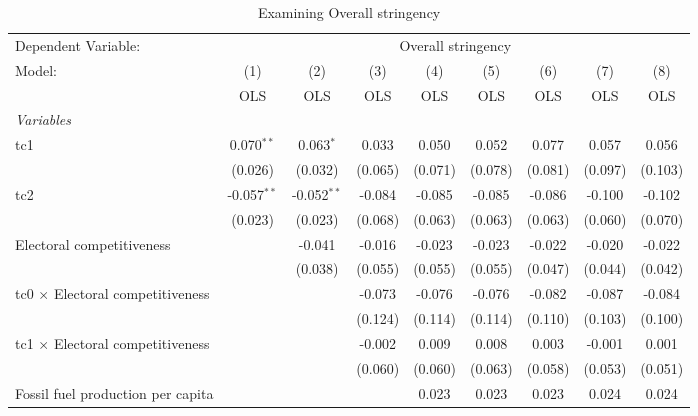
\begin{table}[htbp]
   \caption{Examining Overall stringency}
   \centering
   \begin{tabular}{lcccccccc}
      \toprule
      Dependent Variable: & \multicolumn{8}{c}{Overall stringency}\\
      Model:                                  & (1)           & (2)           & (3)     & (4)     & (5)     & (6)     & (7)     & (8)\\  
                                              &  OLS          & OLS           & OLS     & OLS     & OLS     & OLS     & OLS     & OLS\\  
      \midrule
      \emph{Variables}\\
      tc1                                     & 0.070$^{**}$  & 0.063$^{*}$   & 0.033   & 0.050   & 0.052   & 0.077   & 0.057   & 0.056\\   
                                              & (0.026)       & (0.032)       & (0.065) & (0.071) & (0.078) & (0.081) & (0.097) & (0.103)\\   
      tc2                                     & -0.057$^{**}$ & -0.052$^{**}$ & -0.084  & -0.085  & -0.085  & -0.086  & -0.100  & -0.102\\   
                                              & (0.023)       & (0.023)       & (0.068) & (0.063) & (0.063) & (0.063) & (0.060) & (0.070)\\   
      Electoral competitiveness               &               & -0.041        & -0.016  & -0.023  & -0.023  & -0.022  & -0.020  & -0.022\\   
                                              &               & (0.038)       & (0.055) & (0.055) & (0.055) & (0.047) & (0.044) & (0.042)\\   
      tc0 $\times$ Electoral competitiveness  &               &               & -0.073  & -0.076  & -0.076  & -0.082  & -0.087  & -0.084\\   
                                              &               &               & (0.124) & (0.114) & (0.114) & (0.110) & (0.103) & (0.100)\\   
      tc1 $\times$ Electoral competitiveness  &               &               & -0.002  & 0.009   & 0.008   & 0.003   & -0.001  & 0.001\\   
                                              &               &               & (0.060) & (0.060) & (0.063) & (0.058) & (0.053) & (0.051)\\   
      Fossil fuel production per capita       &               &               &         & 0.023   & 0.023   & 0.023   & 0.024   & 0.024\\   

\end{tabular}
\end{table}
